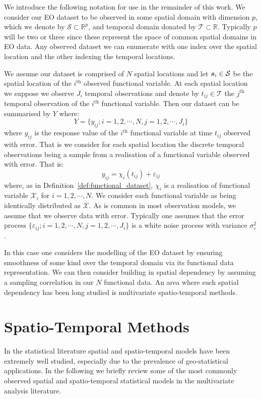 We introduce the following notation for use in the remainder of this work.
We consider our EO dataset to be observed in some spatial domain with dimension $p$, which we denote by $\mathcal{S} \subset \mathbb{R}^p$, and temporal domain donated by $\mathcal{T} \subset \mathbb{R}$.
Typically $p$ will be two or three since these represent the space of common spatial domains in EO data.
Any observed dataset we can enumerate with one index over the spatial location and the other indexing the temporal locations.

We assume our dataset is comprised of $N$ spatial locations and let $\bm{{s}}_i \in \mathcal{S}$ be the spatial location of the $i^\text{th}$ observed functional variable.
At each spatial location we suppose we observe $J_i$ temporal observations and denote by $t_{ij} \in \mathcal{T}$ the $j^\text{th}$ temporal observation of the $i^\text{th}$ functional variable.
Then our dataset can be summarised by $Y$ where:
\begin{equation}
	Y = \{ y_{ij}; i=1,2,\cdots,N, j=1,2, \cdots, J_i \}
	\label{eqn:observed_data}
\end{equation}
where $y_{ij}$ is the response value of the $i^\text{th}$ functional variable at time $t_{ij}$ observed with error.
That is we consider for each spatial location the discrete temporal observations being a sample from a realisation of a functional variable observed with error.
That is:
\begin{equation}
	y_{ij} = \chi_{i}\left( t_{ij} \right) + \varepsilon_{ij}
	\label{eqn:fd_temporal}
\end{equation}
where, as in Definition~\ref{def:functional_dataset}, $\chi_i$ is a realisation of functional variable $\mathcal{X}_i$ for $i=1,2,\cdots,N$.
We consider each functional variable as being identically distributed as $\mathcal{X}$.
As is common in most observation models, we assume that we observe data with error.
Typically one assumes that the error process $\{\varepsilon_{ij}; i=1,2,\cdots,N, j=1,2,\cdots,J_i\}$ is a white noise process with variance $\sigma_\varepsilon^2$. 

In this case one considers the modelling of the EO dataset by ensuring smoothness of some kind over the temporal domain via its functional data representation.
We can then consider building in spatial dependency by assuming a sampling correlation in our $N$ functional data.
An area where such spatial dependency has been long studied is multivariate spatio-temporal methods.

\section{Spatio-Temporal Methods \label{sec:st_methods}}
In the statistical literature spatial and spatio-temporal models have been extremely well studied, especially due to the prevalence of geo-statistical applications.
In the following we briefly review some of the most commonly observed spatial and spatio-temporal statistical models in the multivariate analysis literature. 

